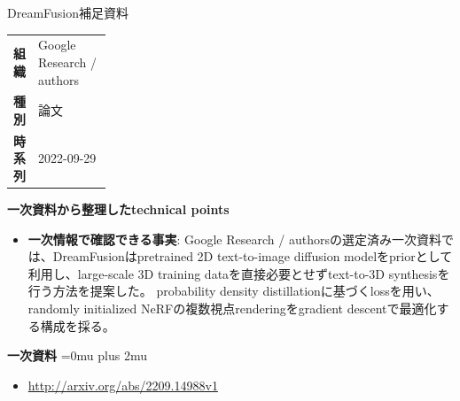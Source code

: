 \begin{technicalnote}{DreamFusion}{補足資料}
\begingroup
\begin{tabularx}{\linewidth}{@{}>{\bfseries}p{0.22\linewidth}X@{}}
組織 & Google Research / authors \\
種別 & 論文 \\
時系列 & 2022-09-29 \\
\end{tabularx}
\smallskip
{\bfseries 一次資料から整理したtechnical points}
\begin{itemize}[leftmargin=1.5em,itemsep=0.35em]
\item \textbf{一次情報で確認できる事実}: Google Research / authorsの選定済み一次資料では、DreamFusionはpretrained 2D text-to-image diffusion modelをpriorとして利用し、large-scale 3D training dataを直接必要とせずtext-to-3D synthesisを行う方法を提案した。 probability density distillationに基づくlossを用い、randomly initialized NeRFの複数視点renderingをgradient descentで最適化する構成を採る。
\end{itemize}
\begin{minipage}{\linewidth}
\begin{samepage}
{\bfseries 一次資料}
\begingroup\sloppy
\Urlmuskip=0mu plus 2mu\relax
\begin{itemize}[leftmargin=1.5em,itemsep=0.25em]
\item {\scriptsize\url{http://arxiv.org/abs/2209.14988v1}}
\end{itemize}
\endgroup
\end{samepage}
\end{minipage}
\endgroup
\end{technicalnote}
\medskip
